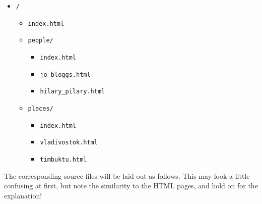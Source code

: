 \documentclass[english]{scrartcl}
\begin{document}
\begin{itemize}
\item \texttt{/}
  \begin{itemize}
  \item \texttt{index.html}
  \item \texttt{people/}
    \begin{itemize}
    \item \texttt{index.html}
    \item \texttt{jo\_bloggs.html}
    \item \texttt{hilary\_pilary.html}
    \end{itemize}
  \item \texttt{places/}
    \begin{itemize}
    \item \texttt{index.html}
    \item \texttt{vladivostok.html}
    \item \texttt{timbuktu.html}
    \end{itemize}
  \end{itemize}
\end{itemize}

The corresponding source files will be laid out as follows. This may
look a little confusing at first, but note the similarity to the HTML
pages, and hold on for the explanation!
\end{document}
